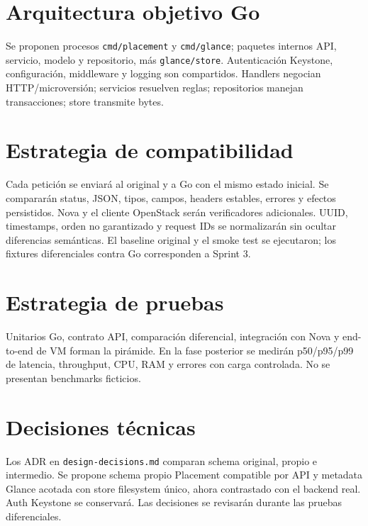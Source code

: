 \documentclass[10pt,a4paper]{article}
\begin{document}
\section{Arquitectura objetivo Go}
Se proponen procesos \texttt{cmd/placement} y \texttt{cmd/glance}; paquetes internos API, servicio, modelo y repositorio, más \texttt{glance/store}. Autenticación Keystone, configuración, middleware y logging son compartidos. Handlers negocian HTTP/microversión; servicios resuelven reglas; repositorios manejan transacciones; store transmite bytes.

\section{Estrategia de compatibilidad}
Cada petición se enviará al original y a Go con el mismo estado inicial. Se compararán status, JSON, tipos, campos, headers estables, errores y efectos persistidos. Nova y el cliente OpenStack serán verificadores adicionales. UUID, timestamps, orden no garantizado y request IDs se normalizarán sin ocultar diferencias semánticas. El baseline original y el smoke test se ejecutaron; los fixtures diferenciales contra Go corresponden a Sprint 3.

\section{Estrategia de pruebas}
Unitarios Go, contrato API, comparación diferencial, integración con Nova y end-to-end de VM forman la pirámide. En la fase posterior se medirán p50/p95/p99 de latencia, throughput, CPU, RAM y errores con carga controlada. No se presentan benchmarks ficticios.

\section{Decisiones técnicas}
Los ADR en \texttt{design-decisions.md} comparan schema original, propio e intermedio. Se propone schema propio Placement compatible por API y metadata Glance acotada con store filesystem único, ahora contrastado con el backend real. Auth Keystone se conservará. Las decisiones se revisarán durante las pruebas diferenciales.
\end{document}
